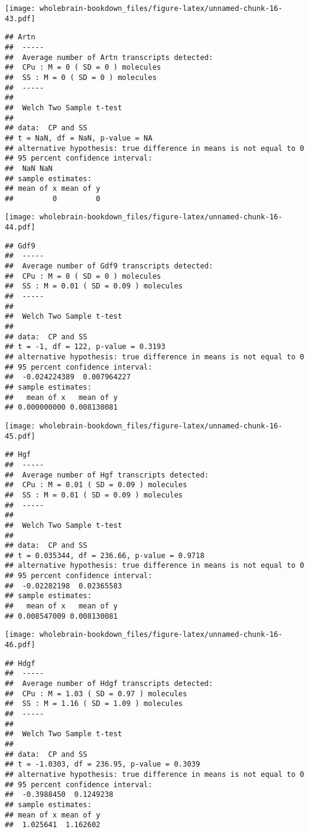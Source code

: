 \documentclass[]{book}
\theoremstyle{definition}
\theoremstyle{definition}
\theoremstyle{remark}
\begin{document}
\texttt{[image: wholebrain-bookdown\_files/figure-latex/unnamed-chunk-16-43.pdf]}

\begin{verbatim}
## Artn
##  -----
##  Average number of Artn transcripts detected:
##  CPu : M = 0 ( SD = 0 ) molecules 
##  SS : M = 0 ( SD = 0 ) molecules
##  -----
## 
##  Welch Two Sample t-test
## 
## data:  CP and SS
## t = NaN, df = NaN, p-value = NA
## alternative hypothesis: true difference in means is not equal to 0
## 95 percent confidence interval:
##  NaN NaN
## sample estimates:
## mean of x mean of y 
##         0         0
\end{verbatim}

\texttt{[image: wholebrain-bookdown\_files/figure-latex/unnamed-chunk-16-44.pdf]}

\begin{verbatim}
## Gdf9
##  -----
##  Average number of Gdf9 transcripts detected:
##  CPu : M = 0 ( SD = 0 ) molecules 
##  SS : M = 0.01 ( SD = 0.09 ) molecules
##  -----
## 
##  Welch Two Sample t-test
## 
## data:  CP and SS
## t = -1, df = 122, p-value = 0.3193
## alternative hypothesis: true difference in means is not equal to 0
## 95 percent confidence interval:
##  -0.024224389  0.007964227
## sample estimates:
##   mean of x   mean of y 
## 0.000000000 0.008130081
\end{verbatim}

\texttt{[image: wholebrain-bookdown\_files/figure-latex/unnamed-chunk-16-45.pdf]}

\begin{verbatim}
## Hgf
##  -----
##  Average number of Hgf transcripts detected:
##  CPu : M = 0.01 ( SD = 0.09 ) molecules 
##  SS : M = 0.01 ( SD = 0.09 ) molecules
##  -----
## 
##  Welch Two Sample t-test
## 
## data:  CP and SS
## t = 0.035344, df = 236.66, p-value = 0.9718
## alternative hypothesis: true difference in means is not equal to 0
## 95 percent confidence interval:
##  -0.02282198  0.02365583
## sample estimates:
##   mean of x   mean of y 
## 0.008547009 0.008130081
\end{verbatim}

\texttt{[image: wholebrain-bookdown\_files/figure-latex/unnamed-chunk-16-46.pdf]}

\begin{verbatim}
## Hdgf
##  -----
##  Average number of Hdgf transcripts detected:
##  CPu : M = 1.03 ( SD = 0.97 ) molecules 
##  SS : M = 1.16 ( SD = 1.09 ) molecules
##  -----
## 
##  Welch Two Sample t-test
## 
## data:  CP and SS
## t = -1.0303, df = 236.95, p-value = 0.3039
## alternative hypothesis: true difference in means is not equal to 0
## 95 percent confidence interval:
##  -0.3988450  0.1249238
## sample estimates:
## mean of x mean of y 
##  1.025641  1.162602
\end{verbatim}
\end{document}
